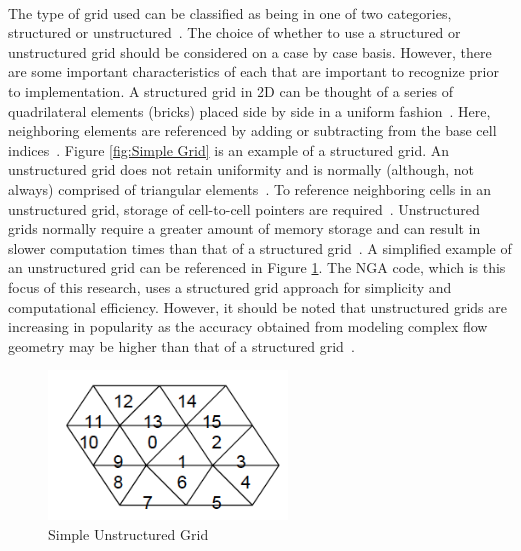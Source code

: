 \paragraph{} The type of grid used can be classified as being in one of two categories, structured or unstructured~\cite{anderson}. The choice of whether to use a structured or unstructured grid should be considered on a case by case basis. However, there are some important characteristics of each that are important to recognize prior to implementation. A structured grid in 2D can be thought of a series of quadrilateral elements (bricks) placed side by side in a uniform fashion~\cite{MIT}. Here, neighboring elements are referenced by adding or subtracting from the base cell indices~\cite{anderson}. Figure \ref{fig:Simple Grid} is an example of a structured grid. An unstructured grid does not retain uniformity and is normally (although, not always) comprised of triangular elements~\cite{tu}. To reference neighboring cells in an unstructured grid, storage of cell-to-cell pointers are required~\cite{MIT}. Unstructured grids normally require a greater amount of memory storage and can result in slower computation times than that of a structured grid~\cite{magoules}. A simplified example of an unstructured grid can be referenced in Figure \ref{fig:Unstructured Grid}. The NGA code, which is this focus of this research, uses a structured grid approach for simplicity and computational efficiency. However, it should be noted that unstructured grids are increasing in popularity as the accuracy obtained from modeling complex flow geometry may be higher than that of a structured grid~\cite{Hirt1981}. 

\begin{figure}[htbp]
	\centering
	\includegraphics[width=2.5in]{figs/unstruc}
	\caption{Simple Unstructured Grid \cite{MIT}}
	\label{fig:Unstructured Grid}
\end{figure}

